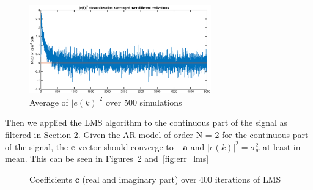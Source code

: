 \documentclass[10pt]{article}
\numberwithin{equation}{section}
\begin{document}
\begin{figure}[h!]
  \centering
  \includegraphics[width = 0.7\textwidth]{images/lmstest_err}
  \caption{Average of $|e(k)|^2$ over 500 simulations}
  \label{fig:err_lms_test}
\end{figure}


Then we applied the LMS algorithm to the continuous part of the signal as filtered in Section 2. Given the AR model of order N = 2 for the continuous part of the signal, the $\mathbf{c}$ vector should converge to $-\mathbf{a}$ and $|e(k)|^2 = \sigma_w^2$ at least in mean. This can be seen in Figures~\ref{fig:coeff_lms} and~\ref{fig:err_lms}

\begin{figure}[h!]
	\centering
  \caption{Coefficients $\mathbf{c}$ (real and imaginary part) over 400 iterations of LMS}
  \label{fig:coeff_lms}
\end{figure}
\end{document}
